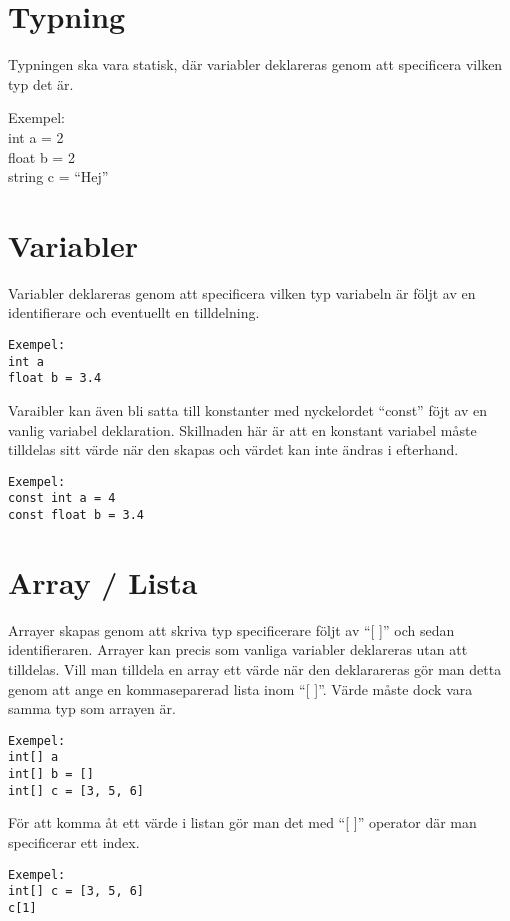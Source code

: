 \documentclass{TDP003mall}
\begin{document}
    \section{Typning}
    Typningen ska vara statisk, där variabler deklareras genom att specificera vilken typ det är.

    Exempel: \\
    int a = 2 \\
    float b = 2 \\
    string c = ``Hej''

    \section{Variabler}
    Variabler deklareras genom att specificera vilken typ variabeln är följt av en identifierare och eventuellt en tilldelning.

\begin{verbatim}
Exempel:
int a
float b = 3.4
\end{verbatim}

Varaibler kan även bli satta till konstanter med nyckelordet ``const'' föjt av en vanlig variabel deklaration. Skillnaden här är att en konstant variabel måste tilldelas sitt värde när den skapas och värdet kan inte ändras i efterhand.

\begin{verbatim}
Exempel:
const int a = 4
const float b = 3.4
\end{verbatim}

\section{Array / Lista}
Arrayer skapas genom att skriva typ specificerare följt av ``[ ]'' och sedan identifieraren. Arrayer kan precis som vanliga variabler deklareras utan att tilldelas. Vill man tilldela en array ett värde när den deklarareras gör man detta genom att ange en kommaseparerad lista inom ``[ ]''. Värde måste dock vara samma typ som arrayen är.

\begin{verbatim}
Exempel:
int[] a
int[] b = []
int[] c = [3, 5, 6]
\end{verbatim}

För att komma åt ett värde i listan gör man det med ``[ ]'' operator där man specificerar ett index.

\begin{verbatim}
Exempel:
int[] c = [3, 5, 6]
c[1]
\end{verbatim}
\end{document}
